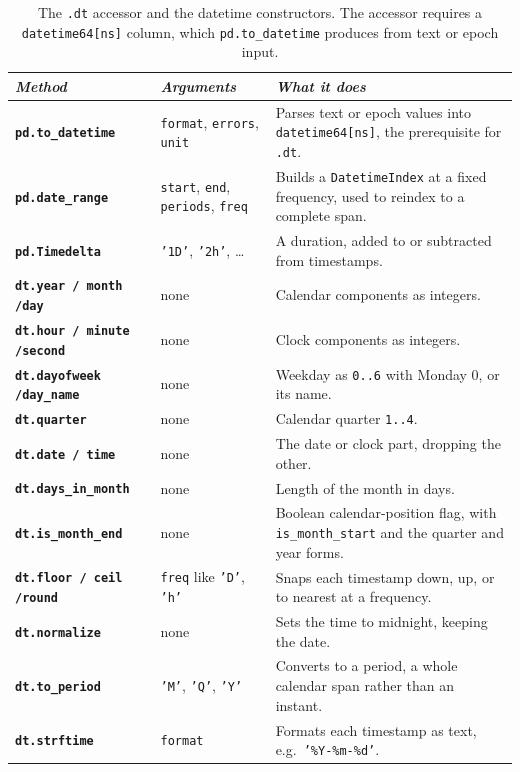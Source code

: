 \begin{table}[H]
\centering
\footnotesize
\renewcommand{\arraystretch}{1.4}
\begin{tabularx}{\textwidth}{>{\raggedright\arraybackslash}p{} >{\raggedright\arraybackslash}p{} >{\raggedright\arraybackslash}X}
\toprule
\textit{Method} & \textit{Arguments} & \textit{What it does} \\
\midrule
\textbf{\texttt{pd.to\_datetime}} & \texttt{format}, \texttt{errors}, \texttt{unit} & Parses text or epoch values into \texttt{datetime64[ns]}, the prerequisite for \texttt{.dt}. \\
\textbf{\texttt{pd.date\_range}} & \texttt{start}, \texttt{end}, \texttt{periods}, \texttt{freq} & Builds a \texttt{DatetimeIndex} at a fixed frequency, used to reindex to a complete span. \\
\textbf{\texttt{pd.Timedelta}} & \texttt{'1D'}, \texttt{'2h'}, \ldots & A duration, added to or subtracted from timestamps. \\
\textbf{\texttt{dt.year / month /\allowbreak day}} & none & Calendar components as integers. \\
\textbf{\texttt{dt.hour / minute /\allowbreak second}} & none & Clock components as integers. \\
\textbf{\texttt{dt.dayofweek /\allowbreak day\_name}} & none & Weekday as \texttt{0..6} with Monday 0, or its name. \\
\textbf{\texttt{dt.quarter}} & none & Calendar quarter \texttt{1..4}. \\
\textbf{\texttt{dt.date / time}} & none & The date or clock part, dropping the other. \\
\textbf{\texttt{dt.days\_in\_month}} & none & Length of the month in days. \\
\textbf{\texttt{dt.is\_month\_end}} & none & Boolean calendar-position flag, with \texttt{is\_month\_start} and the quarter and year forms. \\
\textbf{\texttt{dt.floor / ceil /\allowbreak round}} & \texttt{freq} like \texttt{'D'}, \texttt{'h'} & Snaps each timestamp down, up, or to nearest at a frequency. \\
\textbf{\texttt{dt.normalize}} & none & Sets the time to midnight, keeping the date. \\
\textbf{\texttt{dt.to\_period}} & \texttt{'M'}, \texttt{'Q'}, \texttt{'Y'} & Converts to a period, a whole calendar span rather than an instant. \\
\textbf{\texttt{dt.strftime}} & \texttt{format} & Formats each timestamp as text, e.g.\ \texttt{'\%Y-\%m-\%d'}. \\
\bottomrule
\end{tabularx}
\caption*{The \texttt{.dt} accessor and the datetime constructors. The accessor requires a \texttt{datetime64[ns]} column, which \texttt{pd.to\_datetime} produces from text or epoch input.}
\end{table}

